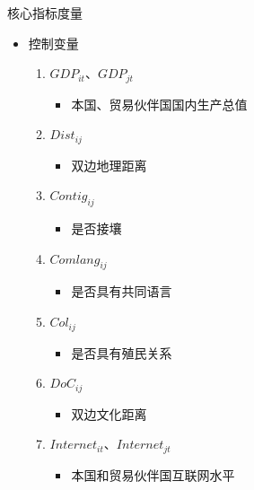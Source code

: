 \documentclass{beamer}
\begin{document}
\begin{frame}{核心指标度量}
    \begin{itemize}
        \item 控制变量
        \begin{enumerate}
            \item $GDP_{it} \text{、} GDP_{jt}$
                \begin{itemize}
                    \item 本国、贸易伙伴国国内生产总值 
                \end{itemize}
            \item $Dist_{ij}$
            \begin{itemize}
                \item 双边地理距离 
            \end{itemize}
            \item $Contig_{ij}$
            \begin{itemize}
                \item 是否接壤
            \end{itemize}
            \item $Comlang_{ij}$
            \begin{itemize}
                \item 是否具有共同语言 
            \end{itemize}
            \item $Col_{ij}$
            \begin{itemize}
                \item 是否具有殖民关系 
            \end{itemize}
            \item $DoC_{ij}$
            \begin{itemize}
                \item 双边文化距离 
            \end{itemize}
            \item $Internet_{it}、Internet_{jt}$
            \begin{itemize}
                \item 本国和贸易伙伴国互联网水平 
            \end{itemize}
        \end{enumerate}
    \end{itemize}
\end{frame}
\end{document}
